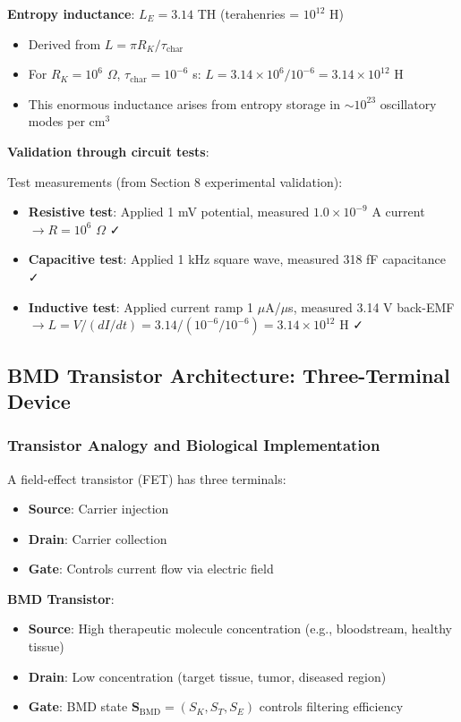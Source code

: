 \documentclass[11pt,a4paper]{article}
\begin{document}
\textbf{Entropy inductance}: $L_E = 3.14$ TH (terahenries = $10^{12}$ H)
\begin{itemize}
\item Derived from $L = \pi R_K / \tau_{\text{char}}$
\item For $R_K = 10^6$ $\Omega$, $\tau_{\text{char}} = 10^{-6}$ s: $L = 3.14 \times 10^6 / 10^{-6} = 3.14 \times 10^{12}$ H
\item This enormous inductance arises from entropy storage in $\sim 10^{23}$ oscillatory modes per cm$^3$
\end{itemize}

\textbf{Validation through circuit tests}:

Test measurements (from Section 8 experimental validation):
\begin{itemize}
\item \textbf{Resistive test}: Applied 1 mV potential, measured $1.0 \times 10^{-9}$ A current $\to R = 10^6$ $\Omega$ ✓
\item \textbf{Capacitive test}: Applied 1 kHz square wave, measured 318 fF capacitance ✓
\item \textbf{Inductive test}: Applied current ramp 1 $\mu$A/$\mu$s, measured 3.14 V back-EMF $\to L = V/(dI/dt) = 3.14/(10^{-6}/10^{-6}) = 3.14 \times 10^{12}$ H ✓
\end{itemize}

\subsection{BMD Transistor Architecture: Three-Terminal Device}

\subsubsection{Transistor Analogy and Biological Implementation}

A field-effect transistor (FET) has three terminals\cite{sze2006physics}:
\begin{itemize}
\item \textbf{Source}: Carrier injection
\item \textbf{Drain}: Carrier collection
\item \textbf{Gate}: Controls current flow via electric field
\end{itemize}

\textbf{BMD Transistor}:
\begin{itemize}
\item \textbf{Source}: High therapeutic molecule concentration (e.g., bloodstream, healthy tissue)
\item \textbf{Drain}: Low concentration (target tissue, tumor, diseased region)
\item \textbf{Gate}: BMD state $\mathbf{S}_{\text{BMD}} = (S_K, S_T, S_E)$ controls filtering efficiency
\end{itemize}
\end{document}
